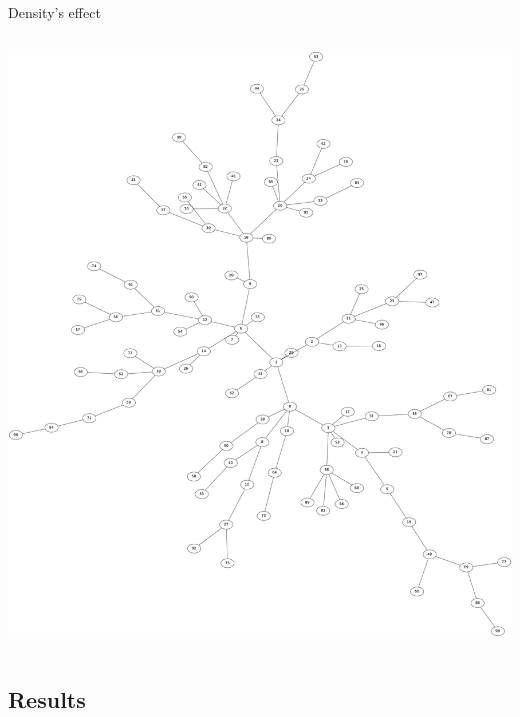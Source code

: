 \documentclass[8pt, handout=show,notes=show]{beamer}
\begin{document}
\begin{frame}{Density's effect}
\begin{columns}
			\includegraphics[width=\imgSize]{images/networks/neato_Network_sparsity98.png}\\
	\end{columns}

\end{frame}



\subsection{Results}
\end{document}
